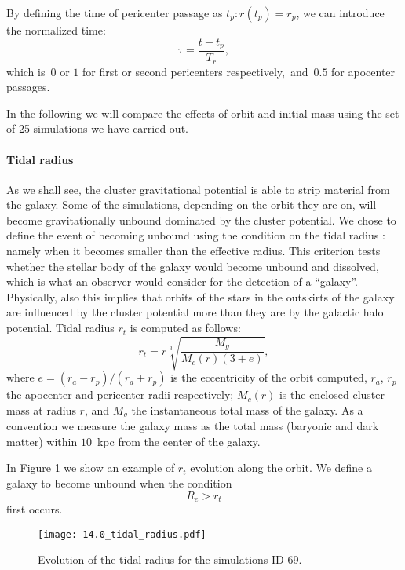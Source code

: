 By defining the time of pericenter passage as $t_p: r(t_p) = r_p$, we can introduce the normalized time:
\begin{equation}
  \label{eq:tau}
\tau = \frac{t-t_p}{T_r},
\end{equation}
which is~$0$ or $1$ for first or second pericenters respectively,~and~$0.5$ for apocenter passages.

In the following we will compare the effects of orbit and initial mass using the set of 25 simulations we have carried out.


\paragraph*{Tidal radius}
As we shall see, the cluster gravitational potential is able to strip material from the galaxy. Some of the simulations, depending on the orbit they are on, will become gravitationally unbound dominated by the cluster potential.
We chose to define the event of becoming unbound using the condition on the tidal radius \cite{King1962}: namely when it becomes smaller than the effective radius.
This criterion tests whether the stellar body of the galaxy would become unbound and dissolved, which is what an observer would consider for the detection of a ``galaxy''.
Physically, also this implies that orbits of the stars in the outskirts of the galaxy are influenced by the cluster potential more than they are by the galactic halo potential.
Tidal radius $r_t$ is computed as follows:
\begin{equation}
r_t = r \sqrt[3]{\frac{M_g}{M_c(r) (3+e)}},
\label{eq:tidal_radius}
\end{equation}
where $e = (r_a - r_p) / (r_a + r_p)$ is the eccentricity of the orbit computed, $r_a$, $r_p$ the apocenter and pericenter radii respectively; $M_c(r)$ is the enclosed cluster mass at radius $r$, and $M_g$ the instantaneous total mass of the galaxy.
As a convention we measure the galaxy mass as the total mass (baryonic and dark matter) within $10$~kpc from the center of the galaxy.

In Figure \ref{fig:tidal_radius} we show an example of $r_t$ evolution along the orbit.
We define a galaxy to become unbound when the condition
\begin{equation}
    R_e > r_t
\label{eq:tidal_radius_condition}
\end{equation}
first occurs.
\begin{figure}
\centering
\texttt{[image: 14.0\_tidal\_radius.pdf]}
\caption{Evolution of the tidal radius for the simulations ID 69.}
\label{fig:tidal_radius}
\end{figure}


